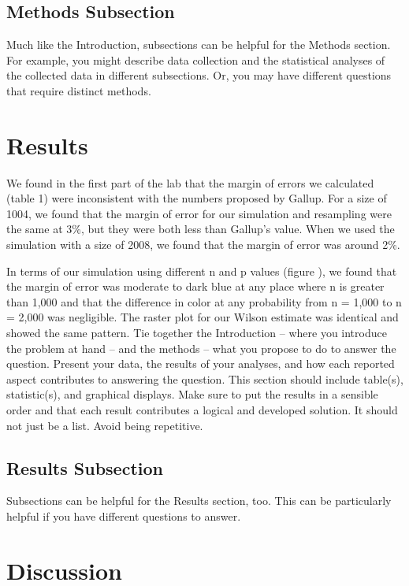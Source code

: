 \documentclass{article}\usepackage[]{graphicx}\usepackage[]{xcolor}
\begin{document}
\begin{multicols}{2}
\subsection{Methods Subsection}
Much like the Introduction, subsections can be helpful for the Methods section. For example, you might describe data collection and the statistical analyses of the collected data in different subsections. Or, you may have different questions that require distinct methods. 

\section{Results}
We found in the first part of the lab that the margin of errors we calculated (table 1) were inconsistent with the numbers proposed by Gallup. For a size of 1004, we found that the margin of error for our simulation and resampling were the same at 3\%, but they were both less than Gallup's value. When we used the simulation with a size of 2008, we found that the margin of error was around 2\%. 

In terms of our simulation using different n and p values (figure ), we found that the margin of error was moderate to dark blue at any place where n is greater than 1,000 and that the difference in color at any probability from n = 1,000 to n = 2,000 was negligible. The raster plot for our Wilson estimate was identical and showed the same pattern. 
Tie together the Introduction -- where you introduce the problem at hand -- and the methods --  what you propose to do to answer the question. Present your data, the results of your analyses, and how each reported aspect contributes to answering the question. This section should include table(s), statistic(s), and graphical displays. Make sure to put the results in a sensible order and that each result contributes a logical and developed solution. It should not just be a list. Avoid being repetitive. 

\subsection{Results Subsection}
Subsections can be helpful for the Results section, too. This can be particularly helpful if you have different questions to answer. 


\section{Discussion}


\end{multicols}
\end{document}
